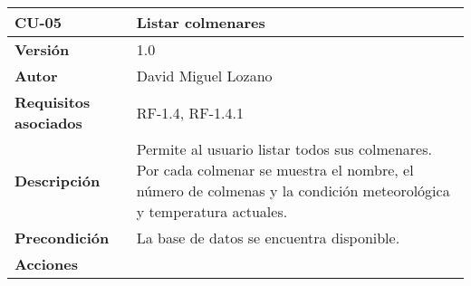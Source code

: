 \begin{longtable}[H]{@{}ll@{}}
\toprule
\begin{minipage}[b]{0.26\columnwidth}\raggedright\strut
\textbf{CU-05}\strut
\end{minipage} & \begin{minipage}[b]{0.68\columnwidth}\raggedright\strut
\textbf{Listar colmenares}\strut
\end{minipage}\tabularnewline
\midrule
\endhead
\begin{minipage}[t]{0.26\columnwidth}\raggedright\strut
\textbf{Versión}\strut
\end{minipage} & \begin{minipage}[t]{0.68\columnwidth}\raggedright\strut
1.0\strut
\end{minipage}\tabularnewline
\begin{minipage}[t]{0.26\columnwidth}\raggedright\strut
\textbf{Autor}\strut
\end{minipage} & \begin{minipage}[t]{0.68\columnwidth}\raggedright\strut
David Miguel Lozano\strut
\end{minipage}\tabularnewline
\begin{minipage}[t]{0.26\columnwidth}\raggedright\strut
\textbf{Requisitos asociados}\strut
\end{minipage} & \begin{minipage}[t]{0.68\columnwidth}\raggedright\strut
RF-1.4, RF-1.4.1\strut
\end{minipage}\tabularnewline
\begin{minipage}[t]{0.26\columnwidth}\raggedright\strut
\textbf{Descripción}\strut
\end{minipage} & \begin{minipage}[t]{0.68\columnwidth}\raggedright\strut
Permite al usuario listar todos sus colmenares. Por cada colmenar se
muestra el nombre, el número de colmenas y la condición meteorológica y
temperatura actuales.\strut
\end{minipage}\tabularnewline
\begin{minipage}[t]{0.26\columnwidth}\raggedright\strut
\textbf{Precondición}\strut
\end{minipage} & \begin{minipage}[t]{0.68\columnwidth}\raggedright\strut
La base de datos se encuentra disponible.\strut
\end{minipage}\tabularnewline
\begin{minipage}[t]{0.26\columnwidth}\raggedright\strut
\textbf{Acciones}\strut
\end{minipage} & \begin{minipage}[t]{0.68\columnwidth}\raggedright\strut

\end{minipage}
\end{longtable}

